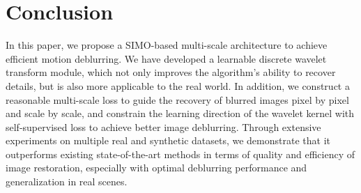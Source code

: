 \documentclass[10pt,twocolumn,letterpaper]{article}
\begin{document}
\section{Conclusion}
In this paper, we propose a SIMO-based multi-scale architecture to achieve efficient motion deblurring. We have developed a learnable discrete wavelet transform module, which not only improves the algorithm's ability to recover details, but is also more applicable to the real world. In addition, we construct a reasonable multi-scale loss to guide the recovery of blurred images pixel by pixel and scale by scale, and constrain the learning direction of the wavelet kernel with self-supervised loss to achieve better image deblurring. Through extensive experiments on multiple real and synthetic datasets, we demonstrate that it outperforms existing state-of-the-art methods in terms of quality and efficiency of image restoration, especially with optimal deblurring performance and generalization in real scenes.
\end{document}
